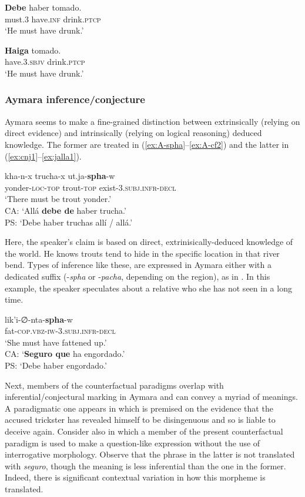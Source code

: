 \documentclass[output=paper,hidelinks]{langscibook}
\begin{document}
\ex \label{ex:infer.CA2}
\gll \textbf{Debe} haber tomado. \\
must.3 have.\textsc{inf} drink.\textsc{ptcp}\\ 
\glt ‘He must have drunk.’ 


\ex \label{ex:infer.CA3}
\gll \textbf{Haiga} tomado. \\
have.3.\textsc{sbjv} drink.\textsc{ptcp} \\ 
\glt ‘He must have drunk.’ 
\z
\z
 





\subsubsection{Aymara inference/conjecture}
Aymara seems to make a fine-grained distinction between extrinsically (relying on direct evidence) and intrinsically (relying on logical reasoning) deduced knowledge. The former are treated in (\ref{ex:A-spha}--\ref{ex:A-cf2}) and the latter in (\ref{ex:cnj1}--\ref{ex:jalla1}).



\ea \label{ex:A-spha}
\gll kha-n-x trucha-x ut.ja-\textbf{spha}-w \\
yonder-\textsc{loc-top} trout-\textsc{top} exist-\textsc{3.subj.infr-decl} \\ 
\glt ‘There must be trout yonder.’ \citep[291]{coler2014grammar}\\ 
CA: ‘Allá \textbf{debe de} haber trucha.’\\
PS: `Debe haber truchas allí / allá.'
\z

Here, the speaker's claim is based on direct, extrinisically-deduced knowledge of the world. He knows trouts tend to hide in the specific location in that river bend. Types of inference like these, are expressed in Aymara either with a dedicated suffix (-\textit{spha} or -\textit{pacha}, depending on the region), as in . In this example, the speaker speculates about a relative who she has not seen in a long time.

\ea \label{ex:A-spha2}
\gll lik'i-∅-nta-\textbf{spha}-w \\
fat-\textsc{cop.vbz-iw-3.subj.infr-decl} \\ 
\glt ‘She must have fattened up.’ \citep[439]{coler2014grammar}\\ 
CA: `\textbf{Seguro que} ha engordado.'\\
PS: `Debe haber engordado.'
\z

Next, members of the counterfactual paradigms overlap with inferential{\slash}con\-jec\-tural marking in Aymara and can convey a myriad of meanings. A paradigmatic one appears in  which is premised on the evidence that the accused trickster has revealed himself to be disingenuous and so is liable to deceive again. Consider also  in which a member of the present counterfactual paradigm is used to make a question-like expression without the use of interrogative morphology. Observe that the phrase in the latter is not translated with \textit{seguro}, though the meaning is less inferential than the one in the former. Indeed, there is significant contextual variation in how this morpheme is translated.
\end{document}
